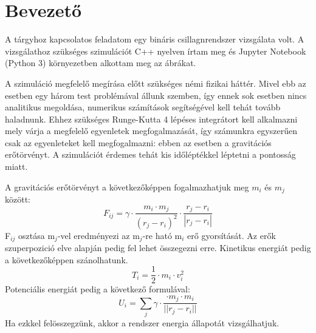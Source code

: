 \section{Bevezető}

A tárgyhoz kapcsolatos feladatom egy bináris csillagnrendszer vizsgálata volt. A vizsgálathoz szükséges szimulációt C++ nyelven írtam meg és Jupyter Notebook (Python 3) környezetben alkottam meg az ábrákat.

A szimuláció megfelelő megírása előtt szükséges némi fizikai háttér. Mivel ebb az esetben egy három test problémával állunk szemben, így ennek sok esetben nincs analitikus megoldása, numerikus számítások segítségével kell tehát tovább haladnunk. Ehhez szükséges Runge-Kutta 4 lépéses integrátort kell alkalmazni mely várja a megfelelő egyenletek megfogalmazását, így számunkra egyszerűen csak az egyenleteket kell megfogalmazni: ebben az esetben a gravitációs erőtörvényt. A szimulációt érdemes tehát kis időléptékkel léptetni a pontosság miatt.

A gravitációs erőtörvényt a következőképpen fogalmazhatjuk meg $m_i$ és $m_j$ között:
\begin{equation}
    F_{ij} = \gamma \cdot \frac{m_i \cdot m_j}{(r_j - r_i)^2} \cdot \frac{r_j - r_i}{|r_j - r_i|}
\end{equation}
F$_{ij}$ osztása m$_j$-vel eredményezi az m$_j$-re ható m$_i$ erő gyorsítását. Az erők szuperpozició elve alapján pedig fel lehet összegezni erre. Kinetikus energiát pedig a következőképpen szánolhatunk.
\begin{equation}
    T_i = \frac{1}{2} \cdot m_i \cdot v_i^2
\end{equation}
Potenciális energiát pedig a következő formulával:
\begin{equation}
    U_i = \sum_j \gamma \cdot \frac{ \cdot  m_j \cdot m_i}{||r_j - r_i||}
\end{equation}
Ha ezkkel felösszegzünk, akkor a rendszer energia állapotát vizsgálhatjuk.
